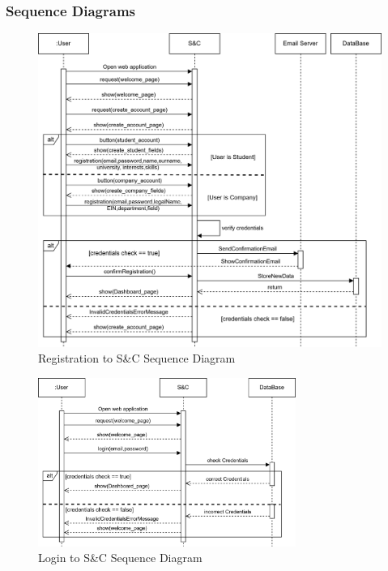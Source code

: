 \subsubsection{Sequence Diagrams}
\begin{figure}[H]
    \centering
    \includegraphics[width=1\textwidth]{Images/Sequence_Diagrams/registration_SD.png}
    \caption{Registration to S\&C Sequence Diagram}
\end{figure}
\begin{figure}[H]
    \centering
    \includegraphics[width=0.75\textwidth]{Images/Sequence_Diagrams/login_SD.png}
    \caption{Login to S\&C Sequence Diagram}
\end{figure}
